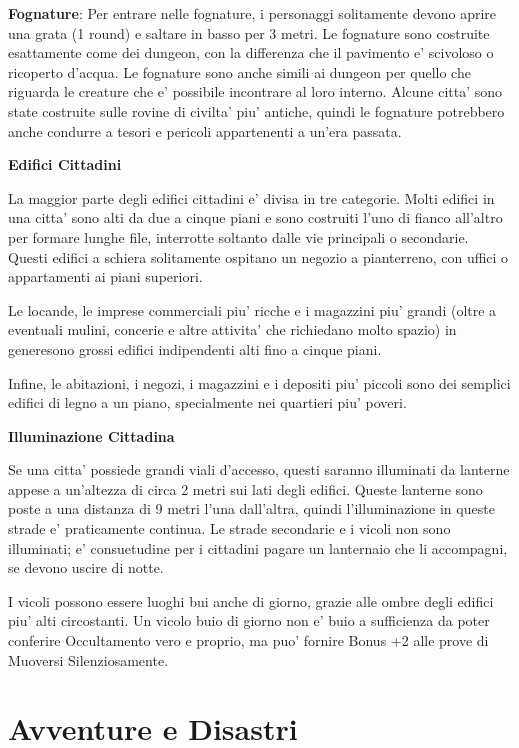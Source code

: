 \documentclass[a4paper,11pt,twoside,openany]{dndbook}
\begin{document}
{\textbf{Fognature}: Per entrare nelle fognature, i personaggi solitamente devono aprire una grata (1 round) e saltare in basso per 3 metri. Le fognature sono costruite esattamente come dei dungeon, con la differenza che il pavimento e' scivoloso o ricoperto d'acqua. Le fognature sono anche simili ai dungeon per quello che riguarda le creature che e' possibile incontrare al loro interno. Alcune citta' sono state costruite sulle rovine di civilta' piu' antiche, quindi le fognature potrebbero anche condurre a tesori e pericoli appartenenti a un'era passata.

\textbf{Edifici Cittadini}

La maggior parte degli edifici cittadini e' divisa in tre categorie. Molti edifici in una citta' sono alti da due a cinque piani e sono costruiti l'uno di fianco all'altro per formare lunghe file, interrotte soltanto dalle vie principali o secondarie. Questi edifici a schiera solitamente ospitano un negozio a pianterreno, con uffici o appartamenti ai piani superiori.

Le locande, le imprese commerciali piu' ricche e i magazzini piu' grandi (oltre a eventuali mulini, concerie e altre attivita' che richiedano molto spazio) in generesono grossi edifici indipendenti alti fino a cinque piani.

Infine, le abitazioni, i negozi, i magazzini e i depositi piu' piccoli sono dei semplici edifici di legno a un piano, specialmente nei quartieri piu' poveri.

\textbf{Illuminazione Cittadina}

Se una citta' possiede grandi viali d'accesso, questi saranno illuminati da lanterne appese a un'altezza di circa 2 metri sui lati degli edifici. Queste lanterne sono poste a una distanza di 9 metri l'una dall'altra, quindi l'illuminazione in queste strade e' praticamente continua. Le strade secondarie e i vicoli non sono illuminati; e' consuetudine per i cittadini pagare un lanternaio che li accompagni, se devono uscire di notte.

I vicoli possono essere luoghi bui anche di giorno, grazie alle ombre degli edifici piu' alti circostanti. Un vicolo buio di giorno non e' buio a sufficienza da poter conferire Occultamento vero e proprio, ma puo' fornire Bonus +2 alle prove di Muoversi Silenziosamente.

\pagebreak

\section{Avventure e Disastri}

}
\end{document}
